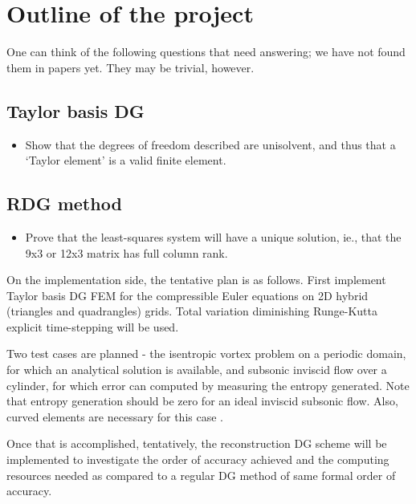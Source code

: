 \documentclass[11pt]{article}
\begin{document}
\section{Outline of the project}
One can think of the following questions that need answering; we have not found them in papers yet. They may be trivial, however.
\subsection{Taylor basis DG}
\begin{itemize}
\item Show that the degrees of freedom described are unisolvent, and thus that a `Taylor element' is a valid finite element.
\end{itemize}
\subsection{RDG method}
\begin{itemize}
\item Prove that the least-squares system will have a unique solution, ie., that the 9x3 or 12x3 matrix has full column rank.
\end{itemize}

On the implementation side, the tentative plan is as follows. First implement Taylor basis DG FEM for the compressible Euler equations on 2D hybrid (triangles and quadrangles) grids. Total variation diminishing Runge-Kutta explicit time-stepping will be used.

Two test cases are planned - the isentropic vortex problem on a periodic domain, for which an analytical solution is available, and subsonic inviscid flow over a cylinder, for which error can computed by measuring the entropy generated. Note that entropy generation should be zero for an ideal inviscid subsonic flow. Also, curved elements are necessary for this case \cite{bassi_dgeuler}.

Once that is accomplished, tentatively, the reconstruction DG scheme will be implemented to investigate the order of accuracy achieved and the computing resources needed as compared to a regular DG method of same formal order of accuracy.


\end{document}
